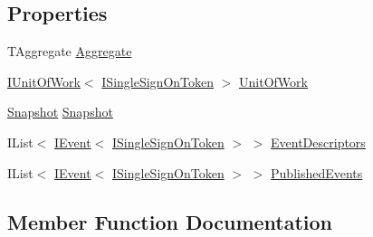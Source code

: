 \subsection*{Properties}
\begin{DoxyCompactItemize}
\item 
T\+Aggregate \hyperlink{classCqrs_1_1Tests_1_1Extensions_1_1TestHelpers_1_1Specification_abbd6b09c0d91f121b9fb84714ab2da3b}{Aggregate}
\item 
\hyperlink{interfaceCqrs_1_1Domain_1_1IUnitOfWork}{I\+Unit\+Of\+Work}$<$ \hyperlink{interfaceCqrs_1_1Authentication_1_1ISingleSignOnToken}{I\+Single\+Sign\+On\+Token} $>$ \hyperlink{classCqrs_1_1Tests_1_1Extensions_1_1TestHelpers_1_1Specification_a922bdbd6e00059fbd09d5108671b3469}{Unit\+Of\+Work}
\item 
\hyperlink{classCqrs_1_1Snapshots_1_1Snapshot}{Snapshot} \hyperlink{classCqrs_1_1Tests_1_1Extensions_1_1TestHelpers_1_1Specification_a3bb6ee35a85bd31d330100fea7406de1}{Snapshot}
\item 
I\+List$<$ \hyperlink{interfaceCqrs_1_1Events_1_1IEvent}{I\+Event}$<$ \hyperlink{interfaceCqrs_1_1Authentication_1_1ISingleSignOnToken}{I\+Single\+Sign\+On\+Token} $>$ $>$ \hyperlink{classCqrs_1_1Tests_1_1Extensions_1_1TestHelpers_1_1Specification_a64d70170c7d5056bbb910074a4935c69}{Event\+Descriptors}
\item 
I\+List$<$ \hyperlink{interfaceCqrs_1_1Events_1_1IEvent}{I\+Event}$<$ \hyperlink{interfaceCqrs_1_1Authentication_1_1ISingleSignOnToken}{I\+Single\+Sign\+On\+Token} $>$ $>$ \hyperlink{classCqrs_1_1Tests_1_1Extensions_1_1TestHelpers_1_1Specification_a2b0b0aa01344e00e92a1908054520d53}{Published\+Events}
\end{DoxyCompactItemize}


\subsection{Member Function Documentation}
\mbox{\label{classCqrs_1_1Tests_1_1Extensions_1_1TestHelpers_1_1Specification_ac3a9d99fb6cde79dfa42167ac013cb7a}} 
